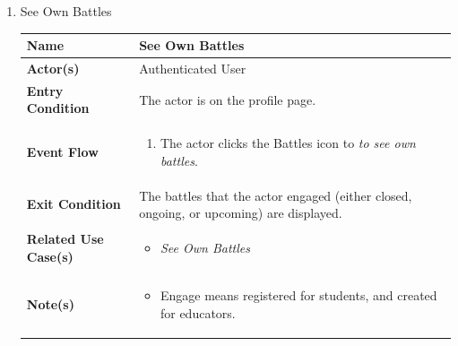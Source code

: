 \begin{enumerate}
\item See Own Battles
\begin{center}
    \begin{tabular}{ | m{10em} | m{10cm}| } 
      \hline
      \textbf{Name} & See Own Battles  \\ 
      \hline
      \textbf{Actor(s)} & Authenticated User \\ 
      \hline
      \textbf{Entry Condition} & The actor is on the profile page. \\ 
      \hline
      \textbf{Event Flow} & 
          \begin{enumerate}[(1)]
              \item The actor clicks the Battles icon to \textit{to see own battles}.
          \end{enumerate}
      \\ 
      \hline
      \textbf{Exit Condition} &  The battles that the actor engaged (either closed, ongoing, or upcoming) are displayed.  \\ 
      \hline
      \textbf{Related Use Case(s)} & 
      \begin{itemize}
          \item \textit{See Own Battles}
      \end{itemize}
          \\ 
      \hline
      \textbf{Note(s)} & 
      \begin{itemize}
          \item Engage means registered for students, and created for educators.
      \end{itemize}
          \\ 
      \hline
    \end{tabular}
\end{center}

\newpage


\end{enumerate}
